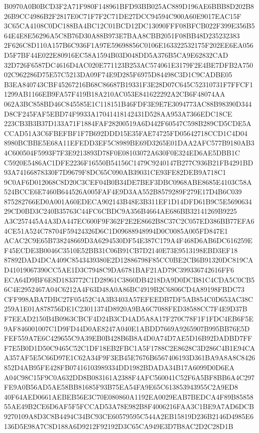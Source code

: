 \documentclass[UTF8,fontset=fandol,zihao=-4,a4paper]{ctexart}
\begin{document}
{{B0970A0B0BCD3F2A71F980F148961BFD93BB025AC889D196AE6BBB8D202B826B9CC4986B2F2817E0C71F7F2C71DE27DCC94594C900A60E9017EAC15F
3C65CA4108C0DC188BA4BC12C01BCD12DC13090FFF08BFCB022F399E356B564E4E8E56296A5C8B76D30A88B973E7BAA8CBB2051F08BB48D235232383
2F626C8D110A157B6C936F1A97E59698856C0106E163322532175F202EE6EA056D5F7BF44E022E80916EC58A1594B03D048DD5A376B5CA9E62832CAD
32D726F6587DC4616D4AC020E771123B253AC574061E3179F2E4BE7DFB2A75002C962286D75E57C5213DA09F74E9D285F6975D84498C3D1C9CADBE05
B3EA840743CBF45267216B68C86687B19331F3E28D07C645C52310731F7FFCF11299AB1166EB9FA57F419B18A210AC053E841622292A2CB6F48074AA
062A3BC858BD46C845585E1C118151B46FDF3E9E7E3094773AC88B98390D344D8CF245FAF5EBD74F9933A17041418142431D528AA953A7366EDC18CE
223CB3B3B37D133A71F1884FAF28200519A6D442F60547C598B289CD5CDE5ACCAD51A3C6FBEFBF1F7B692DDD15E35FAE74725FD05642718CCD1C4D04
8980BCBBE5E68A11EFEDD3EF5C8989BE69D3265E01DAA2AFC577B9180AB34C600504F5993F7F3E9213893D78F0E08103072A630F0E324ED6AE5DBB1C
C5920E5486AC1DFE2236F16550B54156C1479C9240147B277C936B21FB4291BD93A74166878330F7D9679F8DC65C090AB39031CE93FE82DEB9A718C1
9C0AF6D012068C8D20C3CEF04B0B34DE7BEF3DBC0968ABE8685E4103C58A524BCCE6E7460B644526A005FAF4E9D3AA552B8579289F279E17D4B6C039
875282766ED0A001A60EDECA902143B48E3B311EF1D14DFD61B9C5E569063429CD0BD3C240B35763C44FC6CBDC9A356B4664AE686BB32141269B9225
A3C257445A4A3DA447EC600F9F362F2E2E8662B8C37C2C057ED386BB77EFA64CE51A524C78704F59424326D6C1D09688948994D0C0085A005FD847E1
ACAC2C9E65B738248669D3A6294530DF54E387C179A4F468D6AB6DC616259EF45ECDE3B0046C3510E52BB31C06B91CB7D2140E73E9513198EBD3EF18
87892DAD4DCA409C8543439380E2D12886798F85CC0BE2CB6B91320DC819CAD41019067390CC5AE1D3C7948C9DA6781BAF21AD79C399336742616FF6
ECA64D9BF6E8D1833772C1D28961C3860DB4218DA9D0DCB81C4CDA5C0CB56C4E2952467A04C6212A4F63D48A0A86BC4919B2C6806CD4A89198FBDC73
CFF998ABA7DBC27F05452C4A3B3403A57EFEEDB7DF5AB854C0D653AC38C259A1E01A878756DE1C23011374D8920A9BA6C7088FED38588CC7F4E9D37B
F7EEAD2150B4B0963CBCF4D24B3CD4AD5A8A17F270C78F1F1FDC4EB6F5E9AF846001007C1D9FD44D0AE8247A040E1ABDD7669A9265907B995BB76E5D
FEF559A7E6C429655C9A39EB0B428B6B8A4D0A74D7AE5D16B92DADBD7FFF7E5B0D1D50C9465C52C1DF18EB2FBC1A5F1788C2E8628C3D286C4B1E94CA
A357AF5E5C66D97E1C62A34F9F3EB45E7676B6567406193D361BA9A8A8C8426852D4AB95FE428FB07416103989334DD1982BDADA34B17A6099D0D6EA
A04C98C15F9C0A632DD8B083161A2388F4AFC560041C52F6A5BF8BB6A4C297FE9A0B56AD5AE58BB81685F93B75EA54FA9E65C613853943955C2A9ED8
40F64AED0661AEBEB56E3C70E080860A1192EA0029EAB7BEDCA4F89B8585855AE49B2CE6D6AF5F5FCCAD53A78E982B8F4006216FAA3C1BE9A7AD6DCB
9270109A8D3C8B4494C34BC93CE60579595C544A2EB15819D236B2146D4985E6136D5E98A7C8D188A6D9212F92192D3C65CA949E3D7B8AC2D2C28D1B
}}
\end{document}
